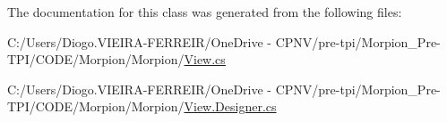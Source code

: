 The documentation for this class was generated from the following files\+:\begin{DoxyCompactItemize}
\item 
C\+:/\+Users/\+Diogo.\+V\+I\+E\+I\+R\+A-\/\+F\+E\+R\+R\+E\+I\+R/\+One\+Drive -\/ C\+P\+N\+V/pre-\/tpi/\+Morpion\+\_\+\+Pre-\/\+T\+P\+I/\+C\+O\+D\+E/\+Morpion/\+Morpion/\hyperlink{_view_8cs}{View.\+cs}\item 
C\+:/\+Users/\+Diogo.\+V\+I\+E\+I\+R\+A-\/\+F\+E\+R\+R\+E\+I\+R/\+One\+Drive -\/ C\+P\+N\+V/pre-\/tpi/\+Morpion\+\_\+\+Pre-\/\+T\+P\+I/\+C\+O\+D\+E/\+Morpion/\+Morpion/\hyperlink{_view_8_designer_8cs}{View.\+Designer.\+cs}\end{DoxyCompactItemize}
